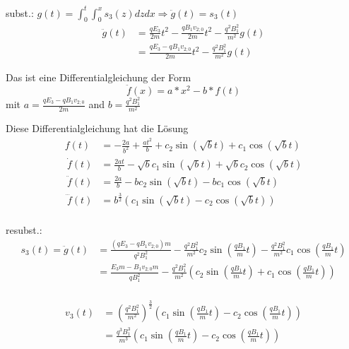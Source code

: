 \documentclass[a4paper, 10pt]{article}
\begin{document}
subst.: $g(t) = \int_0^t \int_0^x s_3(z) dz dx \Rightarrow \ddot{g}(t) = s_3(t)$
%
\begin{equation}
\begin{split}
\ddot{g}(t) 	&= \frac{q E_3}{2m} t^2 - \frac{q B_1 v_{2;0}}{2m} t^2 - \frac{q^2 B_1^2}{m^2} g(t) \\\
			&= \frac{q E_3 - q B_1 v_{2;0}}{2m} t^2 - \frac{q^2 B_1^2}{m^2} g(t)
\end{split}
\end{equation}

Das ist eine Differentialgleichung der Form 
\begin{equation}
\ddot{f}(x) = a * x^2 - b * f(t)
\end{equation}
mit $a=\frac{q E_3 - q B_1 v_{2;0}}{2m}$ and $b=\frac{q^2 B_1^2}{m^2}$

Diese Differentialgleichung hat die Lösung
\begin{equation}
\begin{split}
f(t) &= -\frac{2 a}{b^2} + \frac{a t^2}{b} + c_2 \sin\left(\sqrt{b} t\right) + c_1 \cos\left(\sqrt{b} t\right) \\\
\dot{f}(t) &= \frac{2 a t}{b} - \sqrt{b} c_1 \sin\left(\sqrt{b} t\right) + \sqrt{b} c_2 \cos\left(\sqrt{b} t\right) \\\
\ddot{f}(t) &= \frac{2 a}{b} - b c_2 \sin\left(\sqrt{b} t\right) - b c_1 \cos\left(\sqrt{b} t\right) \\\
\dddot{f}(t) &= b^{\frac{3}{2}} \left(c_1 \sin\left(\sqrt{b} t\right) - c_2 \cos\left(\sqrt{b} t\right)\right) \\\
\end{split}
\end{equation}

resubst.:
\begin{equation}
\begin{split}
s_3(t) = \ddot{g}(t) &= \frac{(q E_3 - q B_1 v_{2;0}) m}{q^2 B_1^2} - \frac{q^2 B_1^2}{m^2} c_2 \sin\left(\frac{q B_1}{m} t\right) - \frac{q^2 B_1^2}{m^2} c_1 \cos\left(\frac{q B_1}{m} t\right) \\\
&= \frac{E_3 m - B_1 v_{2;0} m}{q B_1^2} - \frac{q^2 B_1^2}{m^2} \left(c_2 \sin\left(\frac{q B_1}{m} t\right) + c_1 \cos\left(\frac{q B_1}{m} t\right)\right) \\\
\end{split}
\end{equation}

\begin{equation}
\begin{split}
v_3(t)  &= \left(\frac{q^2 B_1^2}{m^2}\right)^{\frac{3}{2}} \left(c_1 \sin\left(\frac{q B_1}{m} t\right) - c_2 \cos\left(\frac{q B_1}{m} t\right)\right) \\\
		&= \frac{q^3 B_1^3}{m^3} \left(c_1 \sin\left(\frac{q B_1}{m} t\right) - c_2 \cos\left(\frac{q B_1}{m} t\right)\right)
\end{split}
\end{equation}
\end{document}
